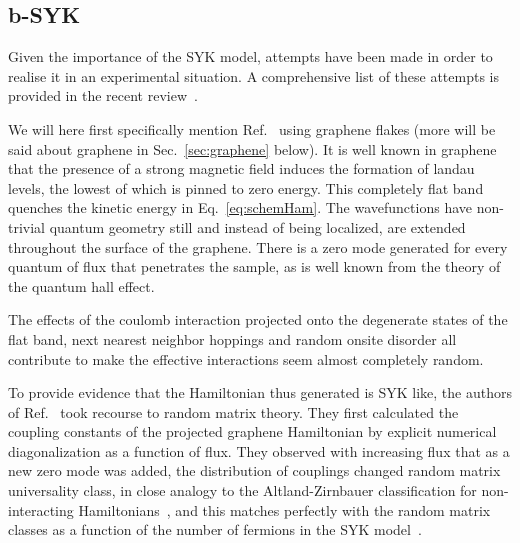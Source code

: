 \subsection{b-SYK}
Given the importance of the SYK model, attempts have been made in order to realise it in an experimental situation. A comprehensive list of these attempts is provided in the recent review~\cite{chowdhury_sachdev-ye-kitaev_2021}. 

\par 
We will here first specifically mention Ref.~\cite{Chen2018} using graphene flakes (more will be said about graphene in Sec.~\ref{sec:graphene} below). It is well known in graphene that the presence of a strong magnetic field induces the formation of landau levels, the lowest of which is pinned to zero energy. This completely flat band quenches the kinetic energy in Eq.~\ref{eq:schemHam}. The wavefunctions have non-trivial quantum geometry still and instead of being localized, are extended throughout the surface of the graphene. There is a zero mode generated for every quantum of flux that penetrates the sample, as is well known from the theory of the quantum hall effect. 

\par
The effects of the coulomb interaction projected onto the degenerate states of the flat band, next nearest neighbor hoppings and random onsite disorder all contribute to make the effective interactions seem almost completely random. 

\par
To provide evidence that the Hamiltonian thus generated is SYK like, the authors of  Ref.~\cite{Chen2018} took recourse to random matrix theory. They first calculated the coupling constants of the projected graphene Hamiltonian by explicit numerical diagonalization as a function of flux. They observed with increasing flux that as a new zero mode was added, the distribution of couplings changed random matrix universality class, in close analogy to the Altland-Zirnbauer classification for non-interacting Hamiltonians~\cite{altland1997nonstandard,fidkowski2010effects,fidkowski2011topological}, and this matches perfectly with the random matrix classes as a function of the number of fermions in the SYK model~\cite{garcia2016spectral,behrends2019tenfold,you2017sachdev}. 

